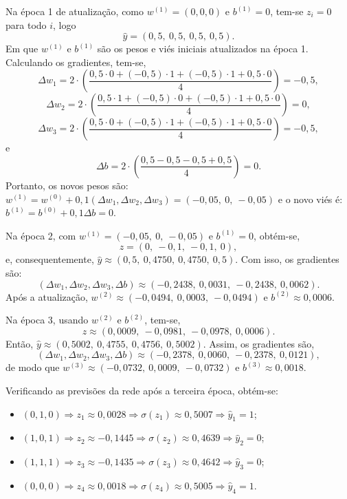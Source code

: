 Na época 1 de atualização, como $w^{(1)} = (0,0,0)$ e $b^{(1)} = 0$, tem-se $z_i = 0$ para todo $i$, logo
$$
\hat{y} = (0,5,\ 0,5,\ 0,5,\ 0,5).
$$
Em que $w^{(1)}$ e $b^{(1)}$ são os pesos e viés iniciais atualizados na época 1. Calculando os gradientes, tem-se,
$$
\Delta w_1 =2\cdot \left( \frac{0,5\cdot0 + (-0,5)\cdot1 + (-0,5)\cdot1 + 0,5\cdot0}{4}\right) = -0,5,
$$
$$
\Delta w_2 = 2\cdot \left( \frac{0,5\cdot1 + (-0,5)\cdot0 + (-0,5)\cdot1 + 0,5\cdot0}{4} \right)  = 0,
$$
$$
\Delta w_3 = 2\cdot \left( \frac{0,5\cdot0 + (-0,5)\cdot1 + (-0,5)\cdot1 + 0,5\cdot0}{4} \right)  = -0,5,
$$
e
$$
\Delta b = 2\cdot \left( \frac{0,5 - 0,5 - 0,5 + 0,5}{4} \right) = 0.
$$
Portanto, os novos pesos são: $w^{(1)} = w^{(0)} + 0,1(\Delta w_1,\Delta w_2,\Delta w_3) = (-0,05,\ 0,\ -0,05)$
e o novo viés é:
$
b^{(1)} = b^{(0)} + 0,1\Delta b = 0.
$

Na época 2, com $w^{(1)} = (-0,05,\ 0,\ -0,05)$ e $b^{(1)}=0$, obtém-se,
$$
z = (0,\ -0,1,\ -0,1,\ 0),
$$
e, consequentemente,
$
\hat{y} \approx (0,5,\ 0,4750,\ 0,4750,\ 0,5).
$
Com isso, os gradientes são:
$$
(\Delta w_1,\Delta w_2,\Delta w_3,\Delta b) \approx (-0,2438,\ 0,0031,\ -0,2438,\ 0,0062).
$$
Após a atualização,
$
w^{(2)} \approx (-0,0494,\ 0,0003,\ -0,0494)
$
e
$
b^{(2)} \approx 0,0006.
$

Na época 3, usando $w^{(2)}$ e $b^{(2)}$, tem-se,
$$
z \approx (0,0009,\ -0,0981,\ -0,0978,\ 0,0006).
$$
Então,
$
\hat{y} \approx (0,5002,\ 0,4755,\ 0,4756,\ 0,5002).
$
Assim, os gradientes são,
$$
(\Delta w_1,\Delta w_2,\Delta w_3,\Delta b) \approx (-0,2378,\ 0,0060,\ -0,2378,\ 0,0121),
$$
de modo que
$
w^{(3)} \approx (-0,0732,\ 0,0009,\ -0,0732)
$
e
$
b^{(3)} \approx 0,0018.
$

Verificando as previsões da rede após a terceira época, obtém-se:

\begin{itemize}
    \item[$x^{(1)}$:] $(0,1,0) \Rightarrow z_1 \approx 0,0028 \Rightarrow \sigma(z_1) \approx 0,5007 \Rightarrow \hat{y}_1 = 1$;
    \item[$x^{(2)}$:] $(1,0,1) \Rightarrow z_2 \approx -0,1445 \Rightarrow \sigma(z_2) \approx 0,4639 \Rightarrow \hat{y}_2 = 0$;
    \item[$x^{(3)}$:] $(1,1,1) \Rightarrow z_3 \approx -0,1435 \Rightarrow \sigma(z_3) \approx 0,4642 \Rightarrow \hat{y}_3 = 0$;
    \item[$x^{(4)}$:] $(0,0,0) \Rightarrow z_4 \approx 0,0018 \Rightarrow \sigma(z_4) \approx 0,5005 \Rightarrow \hat{y}_4 = 1$.
\end{itemize}

